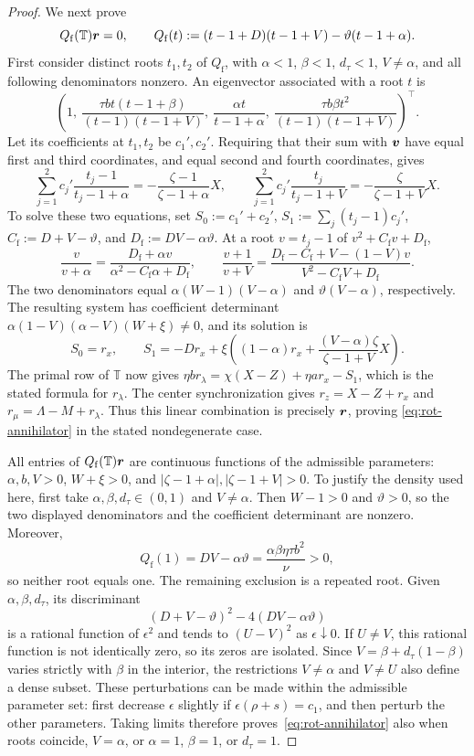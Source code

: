 \begin{proof}
We next prove
\begin{equation}
\label{eq:rot-annihilator}
Q_\mathrm{f}(\mathbb T)\bm{r}=0,
\qquad Q_\mathrm{f}(t):=(t-1+D)(t-1+V)-\vartheta(t-1+\alpha).
\end{equation}
First consider distinct roots \(t_1,t_2\) of \(Q_\mathrm{f}\), with
\(\alpha<1\), \(\beta<1\), \(d_\tau<1\), \(V\ne\alpha\), and all
following denominators nonzero. An eigenvector associated with a root \(t\) is
\[
\left(1,\ \frac{\tau bt(t-1+\beta)}{(t-1)(t-1+V)},\
\frac{\alpha t}{t-1+\alpha},\
\frac{\tau b\beta t^2}{(t-1)(t-1+V)}\right)^\top.
\]
Let its coefficients at \(t_1,t_2\) be \(c_1',c_2'\).
Requiring that their sum with \(\bm{v}\) have equal first and third
coordinates, and equal second and fourth coordinates, gives
\[
\sum_{j=1}^2c_j'\frac{t_j-1}{t_j-1+\alpha}
=-\frac{\zeta-1}{\zeta-1+\alpha}X,
\qquad
\sum_{j=1}^2c_j'\frac{t_j}{t_j-1+V}
=-\frac\zeta{\zeta-1+V}X.
\]
To solve these two equations, set
\(S_0:=c_1'+c_2'\), \(S_1:=\sum_j(t_j-1)c_j'\),
\(C_\mathrm{f}:=D+V-\vartheta\), and \(D_\mathrm{f}:=DV-\alpha\vartheta\).
At a root \(v=t_j-1\) of \(v^2+C_\mathrm{f}v+D_\mathrm{f}\),
\[
\frac v{v+\alpha}
=\frac{D_\mathrm{f}+\alpha v}{\alpha^2-C_\mathrm{f}\alpha+D_\mathrm{f}},
\qquad
\frac{v+1}{v+V}
=\frac{D_\mathrm{f}-C_\mathrm{f}+V-(1-V)v}{V^2-C_\mathrm{f}V+D_\mathrm{f}}.
\]
The two denominators equal \(\alpha(W-1)(V-\alpha)\) and
\(\vartheta(V-\alpha)\), respectively. The resulting system has
coefficient determinant \(\alpha(1-V)(\alpha-V)(W+\xi)\ne0\), and its solution is
\[
S_0=r_x,\qquad
S_1=-Dr_x+\xi\left((1-\alpha)r_x+
\frac{(V-\alpha)\zeta}{\zeta-1+V}X\right).
\]
The primal row of \(\mathbb T\) now gives
\(\eta br_\lambda=\chi(X-Z)+\eta ar_x-S_1\), which is the stated
formula for \(r_\lambda\). The center synchronization gives
\(r_z=X-Z+r_x\) and \(r_\mu=\Lambda-M+r_\lambda\).
Thus this linear combination is precisely \(\bm{r}\), proving
\eqref{eq:rot-annihilator} in the stated nondegenerate case.

All entries of \(Q_\mathrm{f}(\mathbb T)\bm{r}\) are continuous functions
of the admissible parameters: \(\alpha,b,V>0\), \(W+\xi>0\), and
\(|\zeta-1+\alpha|,|\zeta-1+V|>0\).
To justify the density used here, first take
\(\alpha,\beta,d_\tau\in(0,1)\) and \(V\ne\alpha\).
Then \(W-1>0\) and \(\vartheta>0\), so the two displayed denominators
and the coefficient determinant are nonzero. Moreover,
\[
Q_\mathrm{f}(1)=DV-\alpha\vartheta
=\frac{\alpha\beta\eta\tau b^2}{\nu}>0,
\]
so neither root equals one. The remaining exclusion is a repeated root.
Given \(\alpha,\beta,d_\tau\), its discriminant
\[
(D+V-\vartheta)^2-4(DV-\alpha\vartheta)
\]
is a rational function of \(\epsilon^2\) and tends to \((U-V)^2\) as
\(\epsilon\downarrow0\). If \(U\ne V\), this rational function is not
identically zero, so its zeros are isolated. Since
\(V=\beta+d_\tau(1-\beta)\) varies strictly with \(\beta\) in the interior,
the restrictions \(V\ne\alpha\) and \(V\ne U\) also define a dense subset.
These perturbations can be made within the admissible parameter set:
first decrease \(\epsilon\) slightly if
\(\epsilon(\rho+s)=c_1\), and then perturb the other parameters.
Taking limits therefore proves~\eqref{eq:rot-annihilator} also when roots
coincide, \(V=\alpha\), or \(\alpha=1\), \(\beta=1\), or \(d_\tau=1\).


\end{proof}
